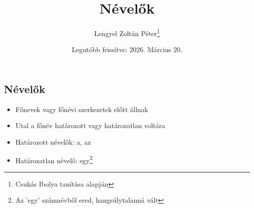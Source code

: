 \documentclass{article}
\title{Névelők}
\author{Lengyel Zoltán Péter\thanks{Csukás Ibolya tanítása alapján}}
\date{Legutóbb frissítve: 2026. Március 20.}
\begin{document}
\maketitle
\tableofcontents
\newpage

\begin{center}
    \section{Névelők}
\end{center}

\begin{itemize}
    \item Főnevek vagy főnévi szerkezetek előtt állnak 
    \item Utal a főnév határozott vagy határozatlan voltára
    \item Határozott névelők: a, az
    \item Határozatlan névelő: egy\footnote{Az 'egy' számnévből ered, hangsúlytalanná vált}
\end{itemize}
\end{document}
